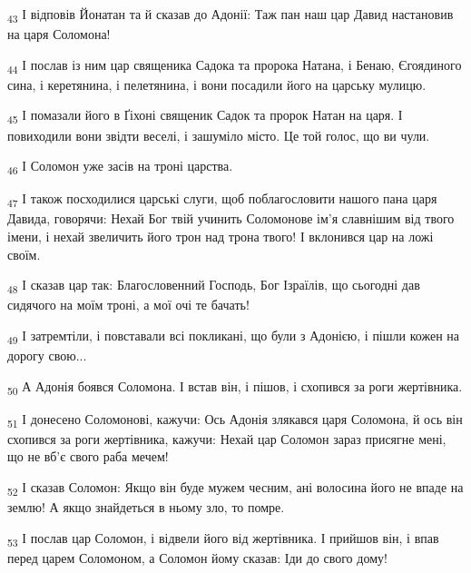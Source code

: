 \begin{tcolorbox}
\textsubscript{43} І відповів Йонатан та й сказав до Адонії: Таж пан наш цар Давид настановив на царя Соломона!
\end{tcolorbox}
\begin{tcolorbox}
\textsubscript{44} І послав із ним цар священика Садока та пророка Натана, і Бенаю, Єгоядиного сина, і керетянина, і пелетянина, і вони посадили його на царську мулицю.
\end{tcolorbox}
\begin{tcolorbox}
\textsubscript{45} І помазали його в Ґіхоні священик Садок та пророк Натан на царя. І повиходили вони звідти веселі, і зашуміло місто. Це той голос, що ви чули.
\end{tcolorbox}
\begin{tcolorbox}
\textsubscript{46} І Соломон уже засів на троні царства.
\end{tcolorbox}
\begin{tcolorbox}
\textsubscript{47} І також посходилися царські слуги, щоб поблагословити нашого пана царя Давида, говорячи: Нехай Бог твій учинить Соломонове ім'я славнішим від твого імени, і нехай звеличить його трон над трона твого! І вклонився цар на ложі своїм.
\end{tcolorbox}
\begin{tcolorbox}
\textsubscript{48} І сказав цар так: Благословенний Господь, Бог Ізраїлів, що сьогодні дав сидячого на моїм троні, а мої очі те бачать!
\end{tcolorbox}
\begin{tcolorbox}
\textsubscript{49} І затремтіли, і повставали всі покликані, що були з Адонією, і пішли кожен на дорогу свою...
\end{tcolorbox}
\begin{tcolorbox}
\textsubscript{50} А Адонія боявся Соломона. І встав він, і пішов, і схопився за роги жертівника.
\end{tcolorbox}
\begin{tcolorbox}
\textsubscript{51} І донесено Соломонові, кажучи: Ось Адонія злякався царя Соломона, й ось він схопився за роги жертівника, кажучи: Нехай цар Соломон зараз присягне мені, що не вб'є свого раба мечем!
\end{tcolorbox}
\begin{tcolorbox}
\textsubscript{52} І сказав Соломон: Якщо він буде мужем чесним, ані волосина його не впаде на землю! А якщо знайдеться в ньому зло, то помре.
\end{tcolorbox}
\begin{tcolorbox}
\textsubscript{53} І послав цар Соломон, і відвели його від жертівника. І прийшов він, і впав перед царем Соломоном, а Соломон йому сказав: Іди до свого дому!
\end{tcolorbox}
